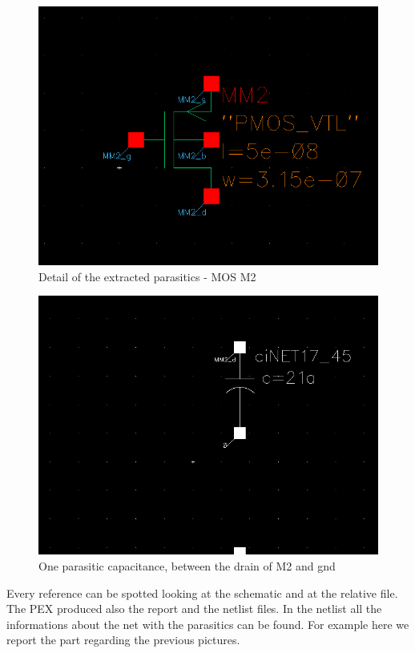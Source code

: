 \documentclass[a4paper]{article}
\begin{document}
\begin{figure}[H]
      \centering
       \includegraphics[width=12cm]{./Images/HA/HAX1_PEX_1.png}
\caption{Detail of the extracted parasitics - MOS M2}
\label{fig: PEX1}
\end{figure}

\begin{figure}[H]
      \centering
       \includegraphics[width=12cm]{./Images/HA/HAX1_PEX_2.png}
\caption{One parasitic capacitance, between the drain of M2 and gnd}
\label{fig: PEX2}
\end{figure}

Every reference can be spotted looking at the schematic and at the relative file. The PEX produced also the report and the netlist files. In the netlist all the informations about the net with the parasitics can be found. For example here we report the part regarding the previous pictures.
\end{document}
